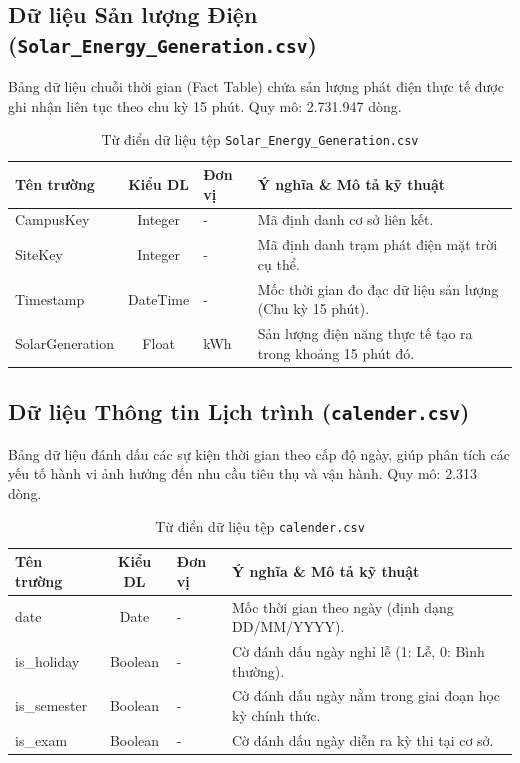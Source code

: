 \documentclass[12pt, a4paper]{report}
\begin{document}
\subsection{Dữ liệu Sản lượng Điện (\texttt{Solar\_Energy\_Generation.csv})}
Bảng dữ liệu chuỗi thời gian (Fact Table) chứa sản lượng phát điện thực tế được ghi nhận liên tục theo chu kỳ 15 phút. Quy mô: 2.731.947 dòng.
\begin{table}[H]
\centering
\caption{Từ điển dữ liệu tệp \texttt{Solar\_Energy\_Generation.csv}}
\renewcommand{\arraystretch}{1.4}
\begin{tabularx}{\textwidth}{p{3.5cm} c p{2cm} X}
\toprule
\textbf{Tên trường} & \textbf{Kiểu DL} & \textbf{Đơn vị} & \textbf{Ý nghĩa \& Mô tả kỹ thuật} \\
\midrule
CampusKey       & Integer  & -   & Mã định danh cơ sở liên kết. \\
SiteKey         & Integer  & -   & Mã định danh trạm phát điện mặt trời cụ thể. \\
Timestamp       & DateTime & -   & Mốc thời gian đo đạc dữ liệu sản lượng (Chu kỳ 15 phút). \\
SolarGeneration & Float    & kWh & Sản lượng điện năng thực tế tạo ra trong khoảng 15 phút đó. \\
\bottomrule
\end{tabularx}
\end{table}

\subsection{Dữ liệu Thông tin Lịch trình (\texttt{calender.csv})}
Bảng dữ liệu đánh dấu các sự kiện thời gian theo cấp độ ngày, giúp phân tích các yếu tố hành vi ảnh hưởng đến nhu cầu tiêu thụ và vận hành. Quy mô: 2.313 dòng.
\begin{table}[H]
\centering
\caption{Từ điển dữ liệu tệp \texttt{calender.csv}}
\renewcommand{\arraystretch}{1.4}
\begin{tabularx}{\textwidth}{p{3.5cm} c p{2cm} X}
\toprule
\textbf{Tên trường} & \textbf{Kiểu DL} & \textbf{Đơn vị} & \textbf{Ý nghĩa \& Mô tả kỹ thuật} \\
\midrule
date         & Date    & - & Mốc thời gian theo ngày (định dạng DD/MM/YYYY). \\
is\_holiday  & Boolean & - & Cờ đánh dấu ngày nghỉ lễ (1: Lễ, 0: Bình thường). \\
is\_semester & Boolean & - & Cờ đánh dấu ngày nằm trong giai đoạn học kỳ chính thức. \\
is\_exam     & Boolean & - & Cờ đánh dấu ngày diễn ra kỳ thi tại cơ sở. \\
\bottomrule
\end{tabularx}
\end{table}
\end{document}
